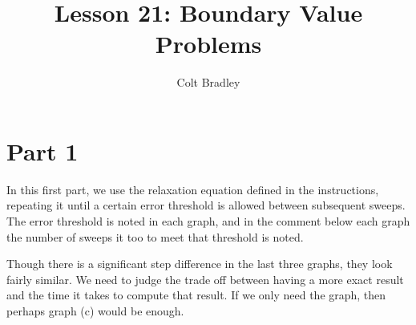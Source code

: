 \documentclass[11pt]{article}
\begin{document}
\title{Lesson 21: Boundary Value Problems}
\author{Colt Bradley}
\date{}
\maketitle

\section{Part 1}

In this first part, we use the relaxation equation defined in the instructions, repeating it until a certain error threshold is allowed between subsequent sweeps. The error threshold is noted in each graph, and in the comment below each graph the number of sweeps it too to meet that threshold is noted. 

Though there is a significant step difference in the last three graphs, they look fairly similar. We need to judge the trade off between having a more exact result and the time it takes to compute that result. If we only need the graph, then perhaps graph (c) would be enough. 
\end{document}
